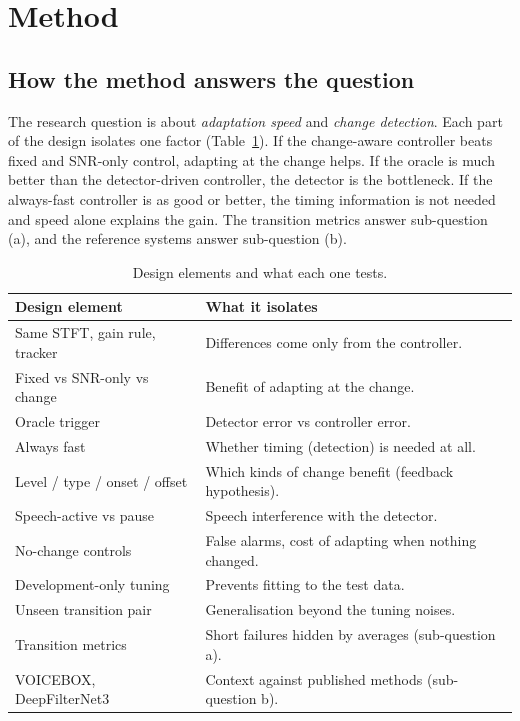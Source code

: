 \documentclass[10pt,conference,a4paper]{IEEEtran}
\begin{document}
\section{Method}
\label{sec:method}

\subsection{How the method answers the question}
The research question is about \emph{adaptation speed} and \emph{change
detection}. Each part of the design isolates one factor
(Table~\ref{tab:design}). If the change-aware controller beats fixed and
SNR-only control, adapting at the change helps. If the oracle is much better
than the detector-driven controller, the detector is the bottleneck. If the
always-fast controller is as good or better, the timing information is not
needed and speed alone explains the gain. The transition metrics answer
sub-question (a), and the reference systems answer sub-question (b).

\begin{table}[t]
\centering
\caption{Design elements and what each one tests.}
\label{tab:design}
\footnotesize
\begin{tabular}{@{}p{2.8cm}p{4.9cm}@{}}
\toprule
Design element & What it isolates\\
\midrule
Same STFT, gain rule, tracker & Differences come only from the controller.\\
Fixed vs SNR-only vs change & Benefit of adapting at the change.\\
Oracle trigger & Detector error vs controller error.\\
Always fast & Whether timing (detection) is needed at all.\\
Level / type / onset / offset & Which kinds of change benefit (feedback hypothesis).\\
Speech-active vs pause & Speech interference with the detector.\\
No-change controls & False alarms, cost of adapting when nothing changed.\\
Development-only tuning & Prevents fitting to the test data.\\
Unseen transition pair & Generalisation beyond the tuning noises.\\
Transition metrics & Short failures hidden by averages (sub-question a).\\
VOICEBOX, DeepFilterNet3 & Context against published methods (sub-question b).\\
\bottomrule
\end{tabular}
\end{table}
\end{document}
